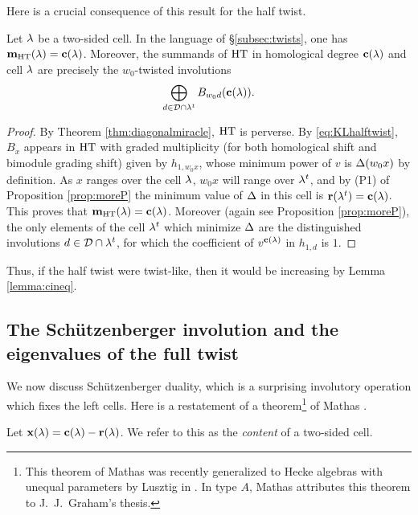 Here is a crucial consequence of this result for the half twist.

\begin{prop} \label{prop:htm} Let $\lambda$ be a two-sided cell. In the language of \S\ref{subsec:twists}, one has ${\mathbf m}_{\operatorname{HT}}(\lambda) = \mathbf{c}(\lambda)$. Moreover, the summands of $\operatorname{HT}$ in homological degree $\mathbf{c}(\lambda)$ and cell $\lambda$ are precisely the $w_0$-twisted involutions \begin{equation} \bigoplus_{d \in {\mathcal{D}} \cap \lambda^t} B_{w_0 d}(\mathbf{c}(\lambda)). \end{equation} \end{prop}
	
\begin{proof} By Theorem \ref{thm:diagonalmiracle}, $\operatorname{HT}$ is perverse. By \eqref{eq:KLhalftwist}, $B_x$ appears in $\operatorname{HT}$ with graded multiplicity (for both homological shift and bimodule grading shift) given by $h_{1,w_0 x}$, whose minimum power of $v$ is $\Delta(w_0 x)$ by definition. As $x$ ranges over the cell $\lambda$, $w_0 x$ will range over $\lambda^t$, and by (P1) of Proposition
\ref{prop:moreP} the minimum value of $\Delta$ in this cell is $\mathbf{r}(\lambda^t) = \mathbf{c}(\lambda)$. This proves that ${\mathbf m}_{\operatorname{HT}}(\lambda) = \mathbf{c}(\lambda)$. Moreover (again see Proposition \ref{prop:moreP}), the
only elements of the cell $\lambda^t$ which minimize $\Delta$ are the distinguished involutions $d \in {\mathcal{D}} \cap \lambda^t$, for which the coefficient of $v^{\mathbf{c}(\lambda)}$ in $h_{1,d}$ is $1$. \end{proof}

Thus, if the half twist were twist-like, then it would be increasing by Lemma \ref{lemma:cineq}.

\subsection{The Sch\"utzenberger involution and the eigenvalues of the full twist}
\label{subsec:schutz}
We now discuss Sch\"utzenberger duality, which is a surprising involutory operation which fixes the left cells. Here is a restatement of a theorem\footnote{This theorem of Mathas was
recently generalized to Hecke algebras with unequal parameters by Lusztig in \cite{LuszLongest15}. In type $A$, Mathas attributes this theorem to J.~J.~Graham's thesis.} of Mathas
\cite[Theorem 3.1]{Mathas96}.

\begin{defn} Let $\mathbf{x}(\lambda) = \mathbf{c}(\lambda) - \mathbf{r}(\lambda)$. We refer to this as the \emph{content} of a two-sided cell. \end{defn}

